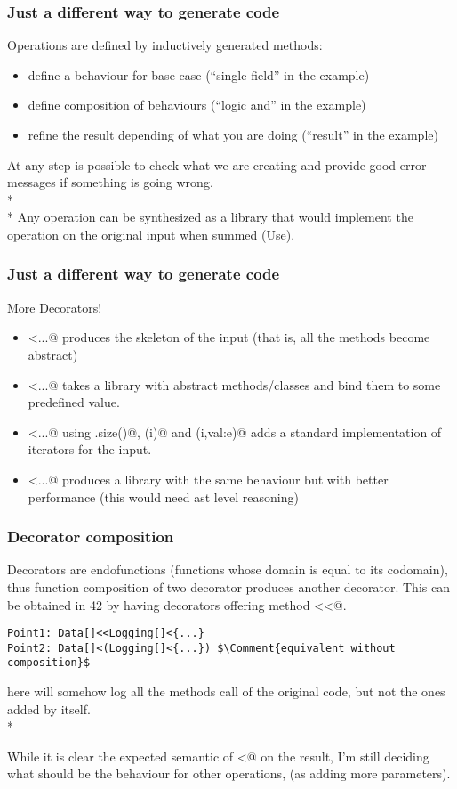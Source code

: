 \begin{frame}[fragile]
\frametitle{Just a different way to generate code}
Operations are defined by inductively generated methods:
\begin{itemize}
\item define a behaviour for base case (``single field'' in the example)
\item define composition of behaviours (``logic and'' in the example)
\item refine the result depending of what you are doing (``result'' in the example) 
\end{itemize}
At any step is possible to check what we are creating and provide good error messages if something is going wrong.\\*${}_{}$\\*
Any operation can be synthesized as a library that would implement the operation on the original input when summed (Use).

\end{frame}


\begin{frame}[fragile]
\frametitle{Just a different way to generate code}
More Decorators! 
\begin{itemize}
\item \Q@Abstract[]<{...}@ produces the skeleton of the input (that is, all the methods become abstract)
\item \Q@Load[]<{...}@ takes a library with abstract methods/classes and bind them to some predefined value.
\item \Q@Iterable[]<{...}@ using \Q@v.size()@, \Q@v(i)@ and \Q@v(i,val:e)@ adds a standard implementation of iterators for the input.
\item \Q@Optimize[]<{...}@ produces a library with the same behaviour but with better performance (this would need ast level reasoning)

\end{itemize}

\end{frame}




\begin{frame}[fragile]
\frametitle{Decorator composition}
Decorators are 
 endofunctions (functions whose domain is equal to its codomain), thus function composition of two decorator produces another decorator.
This can be obtained in 42 by having decorators offering method 
\Q@<<@.
\begin{NiceCode}{59ex}{0.8}
\begin{lstlisting}
Point1: Data[]<<Logging[]<{...}
Point2: Data[]<(Logging[]<{...}) $\Comment{equivalent without composition}$
\end{lstlisting}
\end{NiceCode}
\Q@Logging@ here will somehow log all the methods call of the original code, but not the ones added by \Q@Data@ itself.\\*

While it is clear the expected semantic of \Q@<@ on the result,
I'm still deciding what should be the behaviour for other operations, (as  adding more parameters). 
\end{frame}


